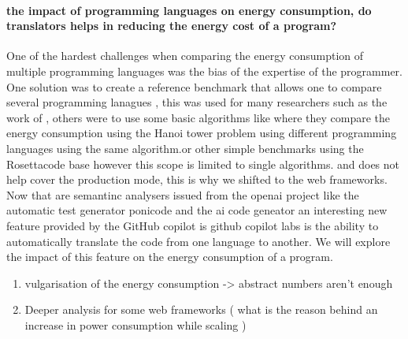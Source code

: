 \paragraph{the impact of programming languages on energy consumption, do translators helps in reducing the energy cost of a program?}
One of the hardest challenges when comparing the energy consumption of multiple programming languages was the bias of the expertise of the programmer. One solution was to create a reference benchmark that allows one to compare several programming lanagues , this was used for many researchers such as the work of \citeauthor{couto2017towards} \cite{couto2017towards}, others were to use some basic algorithms like \cite{noureddine_preliminary_2012} where they compare the energy consumption using the Hanoi tower problem  using different programming languages using the same algorithm.or other simple benchmarks using the Rosettacode base 
however this scope is limited to single algorithms. and does not help cover the production mode, this is why we shifted to the web frameworks.  Now that are semantinc analysers issued from the openai project like the automatic test generator ponicode and the ai code geneator 
an interesting new feature provided by the GitHub copilot is github copilot labs is the ability to automatically translate the code from one language to another. We will explore the impact of this feature on the energy consumption of a program.






\begin{enumerate}
      \item  vulgarisation of the energy consumption -> abstract numbers aren't enough
      \item Deeper analysis for some web frameworks ( what is the reason behind an increase in power consumption while scaling )



\end{enumerate}


